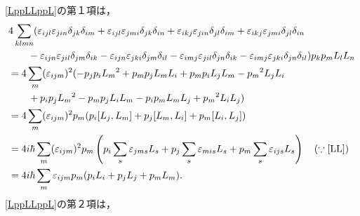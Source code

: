 \eqref{LppLLppL}の第１項は，
\begin{align}
  & 4\sum_{klmn}(\varepsilon_{ijl}\varepsilon_{jin}\delta_{jk}\delta_{im} + \varepsilon_{ijl}\varepsilon_{jmi}\delta_{jk}\delta_{in} + \varepsilon_{ikj}\varepsilon_{jin}\delta_{jl}\delta_{im} + \varepsilon_{ikj}\varepsilon_{jmi}\delta_{jl}\delta_{in}\notag\\
  & \qquad - \varepsilon_{ijn}\varepsilon_{jil}\delta_{jm}\delta_{ik} - \varepsilon_{ijn}\varepsilon_{jki}\delta_{jm}\delta_{il} - \varepsilon_{imj}\varepsilon_{jil}\delta_{jn}\delta_{ik} - \varepsilon_{imj}\varepsilon_{jki}\delta_{jn}\delta_{il})p_kp_mL_lL_n\notag\\
  & = 4\sum_{m}(\varepsilon_{ijm})^2( - p_jp_iL_m{}^2 + p_mp_jL_mL_i + p_mp_iL_jL_m - p_m{}^2L_jL_i\notag\\
  & \qquad  + p_ip_jL_m{}^2 - p_mp_jL_iL_m - p_ip_mL_mL_j + p_m{}^2L_iL_j)\notag\\
  & = 4\sum_m(\varepsilon_{ijm})^2p_m(p_i[L_j,L_m] + p_j[L_m,L_i] + p_m[L_i,L_j])\notag\\
  & = 4i\hbar\sum_m(\varepsilon_{ijm})^2p_m\left(p_i\sum_s\varepsilon_{jms}L_s + p_j\sum_s\varepsilon_{mis}L_s + p_m\sum_s\varepsilon_{ijs}L_s\right)\quad(\because\eqref{LL})\notag\\
  & = 4i\hbar\sum_m\varepsilon_{ijm}p_m(p_iL_i + p_jL_j + p_mL_m)\label{LppLLppL_1}.
\end{align}
\eqref{LppLLppL}の第２項は，
